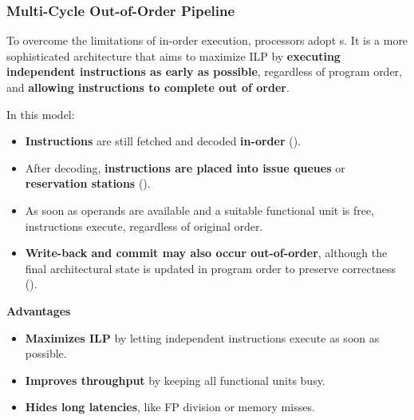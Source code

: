 \subsubsection{Multi-Cycle Out-of-Order Pipeline}\label{subsubsection: Multi-Cycle Out-of-Order Pipeline}

To overcome the limitations of in-order execution, processors adopt s. It is a more sophisticated architecture that aims to maximize ILP by \textbf{executing independent instructions as early as possible}, regardless of program order, and \textbf{allowing instructions to complete out of order}.

\highspace
In this model:
\begin{itemize}
    \item \textbf{Instructions} are still fetched and decoded \textbf{in-order} ().
    \item After decoding, \textbf{instructions are placed into issue queues} or \textbf{reservation stations} ().
    \item As soon as operands are available and a suitable functional unit is free, instructions execute, regardless of original order.
    \item \textbf{Write-back and commit may also occur out-of-order}, although the final architectural state is updated in program order to preserve correctness ().
\end{itemize}

\highspace
\begin{flushleft}
    \textcolor{Green3}{ \textbf{Advantages}}
\end{flushleft}
\begin{itemize}[label=\textcolor{Green3}{}]
    \item \textbf{Maximizes ILP} by letting independent instructions execute as soon as possible.
    \item \textbf{Improves throughput} by keeping all functional units busy.
    \item \textbf{Hides long latencies}, like FP division or memory misses.
\end{itemize}

